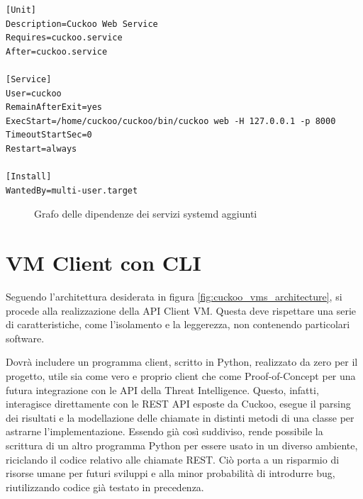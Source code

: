 \begin{code}
\begin{verbatim}
[Unit]
Description=Cuckoo Web Service
Requires=cuckoo.service
After=cuckoo.service

[Service]
User=cuckoo
RemainAfterExit=yes
ExecStart=/home/cuckoo/cuckoo/bin/cuckoo web -H 127.0.0.1 -p 8000
TimeoutStartSec=0
Restart=always

[Install]
WantedBy=multi-user.target
\end{verbatim}
\label{lst:systemd-unit-example}
\caption{Esempio di systemd unit per il servizio Web}
\end{code}
\bigskip

\begin{figure}[htbp]
\centering
{}
\caption{Grafo delle dipendenze dei servizi systemd aggiunti}
\label{fig:systemd-cuckoo-dependency-graph}
\end{figure}

\section{VM Client con CLI}
\label{sez:dynamic-python-client-vm}
Seguendo l'architettura desiderata in figura \ref{fig:cuckoo_vms_architecture},
si procede alla realizzazione della API Client VM.
Questa deve rispettare una serie di caratteristiche, come l'isolamento e la leggerezza, non contenendo particolari software.

Dovrà includere un programma client, scritto in Python, realizzato da zero per il progetto, utile sia come vero e proprio client che come Proof-of-Concept per una futura integrazione con le API della Threat Intelligence. Questo, infatti, interagisce direttamente con le REST API esposte da Cuckoo, esegue il parsing dei risultati e la modellazione delle chiamate in distinti metodi di una classe per astrarne l'implementazione.
Essendo già così suddiviso, rende possibile la scrittura di un altro programma Python per essere usato in un diverso ambiente, riciclando il codice relativo alle chiamate REST. Ciò porta a un risparmio di risorse umane per futuri sviluppi e alla minor probabilità di introdurre bug, riutilizzando codice già testato in precedenza.

